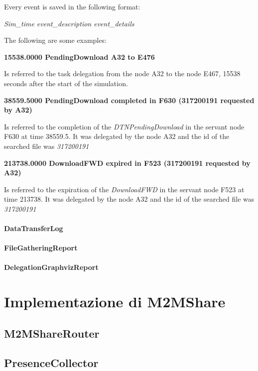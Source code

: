 Every event is saved in the following format:
\begin{center}
\textit{Sim_time	event_description	event_details}
\end{center}
The following are some examples:

\begin{center}
\textbf{15538.0000	PendingDownload	A32 to E476}
\end{center}
Is referred to the task delegation from the node A32 to the node E467, 15538 seconds after the start of the simulation.

\begin{center}
\textbf{38559.5000 PendingDownload completed in F630 (317200191 requested by A32)}
\end{center}
Is referred to the completion of the \textit{DTNPendingDownload} in the servant node F630 at time 38559.5. It was delegated by the node A32 and the id of the searched file was \textit{317200191}

\begin{center}
\textbf{213738.0000	DownloadFWD expired in F523 (317200191 requested by A32)}
\end{center}
Is referred to the expiration of the \textit{DownloadFWD} in the servant node F523 at time 213738. It was delegated by the node A32 and the id of the searched file was \textit{317200191}

\paragraph{DataTransferLog}
\paragraph{FileGatheringReport}
\paragraph{DelegationGraphvizReport}

\section{Implementazione di M2MShare}

\subsection{M2MShareRouter}

\subsection{PresenceCollector}

